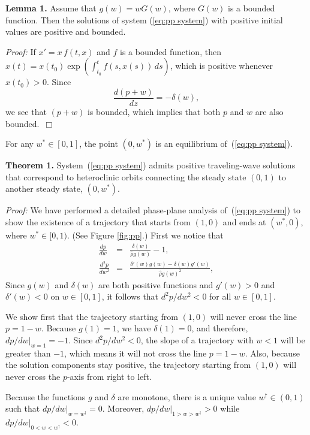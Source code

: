 \documentclass{aims}
\numberwithin{equation}{section}
\begin{document}
\noindent
\textbf{Lemma 1.} Assume that $g(w)=wG(w)$, where $G(w)$ is a bounded function. 
Then the solutions of system (\ref{eq:pp system}) with positive initial values are positive and bounded.

\noindent
\emph{Proof:} If $x'=x\,f(t, x)$ and $f$ is a bounded function, then 
$x(t)=x(t_0)\exp \left(\int^t_{t_0} f(s, x(s))\, ds\right)$, which is positive whenever
$x(t_0)>0$. Since
\begin{equation}
\frac{d(p+w)}{dz}=-\delta(w),
\end{equation}
we see that $(p+w)$ is bounded, which implies that both $p$ and $w$ are also bounded.~$\Box$

For any $w^*\in [0,1]$, the point $(0, w^*)$ is an equilibrium of~(\ref{eq:pp system}).

\noindent
\textbf{Theorem 1.}  System~(\ref{eq:pp system}) admits positive traveling-wave solutions
that correspond to heteroclinic orbits connecting the steady state $(0, 1)$ to another
steady state, $(0, w^*)$.

\indent
\emph{Proof:} We have performed a detailed phase-plane analysis of~(\ref{eq:pp system})
to show the existence of a trajectory that starts from $(1,0)$ and ends at $(w^{*},0)$,
where $w^*\in [0,1)$.  (See Figure \ref{fig:pp}.)
First we notice that 
\begin{eqnarray}
\frac{dp}{dw} & = & \frac{\delta(w)}{\hat{\rho}g(w)}-1 , \\
\frac{d^2 p}{dw^{2}} & = & \frac{\delta'(w)g(w)-\delta(w)g'(w)}{\hat{\rho} g(w)^{2}},
\end{eqnarray}
Since $g(w)$ and $\delta(w)$ are both positive functions and
$g'(w)>0$ and $\delta'(w)<0$ on $w\in [0,1]$, it follows that
$d^{2}p/dw^{2}<0$ for all $w\in [0,1]$. 

We show first that the trajectory starting from $(1,0)$ will never cross the line $p=1-w$.
Because $g(1)=1$, we have $\delta(1)=0$, and therefore, $dp/dw\big\vert_{w=1}=-1$.
Since $d^2 p/dw^{2}<0$, the slope of a trajectory with $w<1$ will be greater than
$-1$, which means it will not cross the line $p=1-w$.
Also, because the solution components stay positive, the trajectory starting
from $(1,0)$ will never cross the $p$-axis from right to left. 

Because the functions $g$ and $\delta$ are monotone, 
there is a unique value $w^{\dagger}\in (0, 1)$ such that 
$dp/dw\big\vert_{w=w^{\dagger}}=0$. 
Moreover, $dp/dw\big\vert_{1>w>w^{\dagger}}>0$ while
$dp/dw\big\vert_{0<w<w^{\dagger}}<0$.
\end{document}
